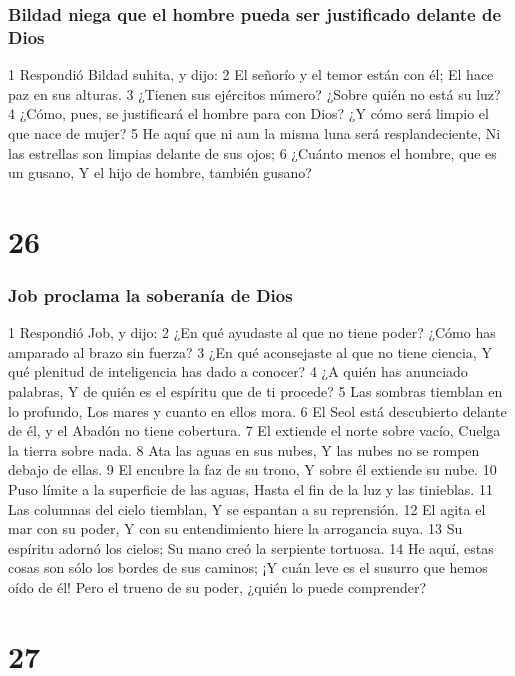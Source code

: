 \subsection*{Bildad niega que el hombre pueda ser justificado delante de Dios}  

1 Respondió Bildad suhita, y dijo:  
2 El señorío y el temor están con él;  
El hace paz en sus alturas.  
3 ¿Tienen sus ejércitos número?  
¿Sobre quién no está su luz?  
4 ¿Cómo, pues, se justificará el hombre para con Dios?  
¿Y cómo será limpio el que nace de mujer?  
5 He aquí que ni aun la misma luna será resplandeciente,  
Ni las estrellas son limpias delante de sus ojos; 
6 ¿Cuánto menos el hombre, que es un gusano,  
Y el hijo de hombre, también gusano?  

\chapter{26}

\subsection*{Job proclama la soberanía de Dios}  

1 Respondió Job, y dijo:  
2 ¿En qué ayudaste al que no tiene poder?  
¿Cómo has amparado al brazo sin fuerza?  
3 ¿En qué aconsejaste al que no tiene ciencia,  
Y qué plenitud de inteligencia has dado a conocer?  
4 ¿A quién has anunciado palabras,  
Y de quién es el espíritu que de ti procede?  
5 Las sombras tiemblan en lo profundo,  
Los mares y cuanto en ellos mora.  
6 El Seol está descubierto delante de él, y el Abadón no tiene cobertura.  
7 El extiende el norte sobre vacío,  
Cuelga la tierra sobre nada.  
8 Ata las aguas en sus nubes,  
Y las nubes no se rompen debajo de ellas.  
9 El encubre la faz de su trono,  
Y sobre él extiende su nube.  
10 Puso límite a la superficie de las aguas,  
Hasta el fin de la luz y las tinieblas.  
11 Las columnas del cielo tiemblan,  
Y se espantan a su reprensión.  
12 El agita el mar con su poder,  
Y con su entendimiento hiere la arrogancia suya.  
13 Su espíritu adornó los cielos;  
Su mano creó la serpiente tortuosa.  
14 He aquí, estas cosas son sólo los bordes de sus caminos;  
¡Y cuán leve es el susurro que hemos oído de él!  
Pero el trueno de su poder, ¿quién lo puede comprender?  

\chapter{27}


